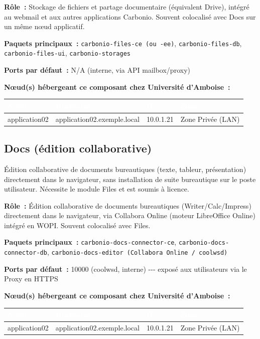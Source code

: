 \documentclass[11pt,a4paper]{report}
\newcommand{\tblhead}[1]{\textcolor{white}{\textbf{#1}}}
\begin{document}
\textbf{Rôle~:} Stockage de fichiers et partage documentaire (équivalent Drive), intégré au webmail et aux autres applications Carbonio.\allowbreak{} Souvent colocalisé avec Docs sur un même nœud applicatif.\allowbreak{}

\textbf{Paquets principaux~:} \texttt{carbonio-\allowbreak{}files-\allowbreak{}ce (ou -\allowbreak{}ee)}, \texttt{carbonio-\allowbreak{}files-\allowbreak{}db}, \texttt{carbonio-\allowbreak{}files-\allowbreak{}ui}, \texttt{carbonio-\allowbreak{}storages}

\textbf{Ports par défaut~:} N/A (interne, via API mailbox/proxy)

\textbf{Nœud(s) hébergeant ce composant chez Université d'Amboise~:}
\begin{longtable}{|p{3.2cm}|p{4.5cm}|p{3.2cm}|p{2.3cm}|}
\hline
\rowcolor{primary}\tblhead{Nœud} & \tblhead{Hostname} & \tblhead{IP} & \tblhead{Zone} \\
\hline
\endhead
application02 & application02.\allowbreak{}exemple.\allowbreak{}local & 10.\allowbreak{}0.\allowbreak{}1.\allowbreak{}21 & Zone Privée (LAN) \\
\hline
\end{longtable}


\subsection{Docs (édition collaborative)}

Édition collaborative de documents bureautiques (texte, tableur, présentation) directement dans le navigateur, sans installation de suite bureautique sur le poste utilisateur.\allowbreak{} Nécessite le module Files et est soumis à licence.\allowbreak{}

\textbf{Rôle~:} Édition collaborative de documents bureautiques (Writer/Calc/Impress) directement dans le navigateur, via Collabora Online (moteur LibreOffice Online) intégré en WOPI.\allowbreak{} Souvent colocalisé avec Files.\allowbreak{}

\textbf{Paquets principaux~:} \texttt{carbonio-\allowbreak{}docs-\allowbreak{}connector-\allowbreak{}ce}, \texttt{carbonio-\allowbreak{}docs-\allowbreak{}connector-\allowbreak{}db}, \texttt{carbonio-\allowbreak{}docs-\allowbreak{}editor (Collabora Online / coolwsd)}

\textbf{Ports par défaut~:} 10000 (coolwsd, interne) -\allowbreak{}-\allowbreak{}-\allowbreak{} exposé aux utilisateurs via le Proxy en HTTPS

\textbf{Nœud(s) hébergeant ce composant chez Université d'Amboise~:}
\begin{longtable}{|p{3.2cm}|p{4.5cm}|p{3.2cm}|p{2.3cm}|}
\hline
\rowcolor{primary}\tblhead{Nœud} & \tblhead{Hostname} & \tblhead{IP} & \tblhead{Zone} \\
\hline
\endhead
application02 & application02.\allowbreak{}exemple.\allowbreak{}local & 10.\allowbreak{}0.\allowbreak{}1.\allowbreak{}21 & Zone Privée (LAN) \\
\hline
\end{longtable}
\end{document}
